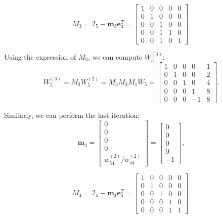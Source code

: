 \documentclass[a4paper,11pt]{article}
\begin{document}
\begin{equation}\label{key}
	M_3=\mathcal{I}_5 - \textbf{m}_3\textbf{e}_3^T =
	\begin{bmatrix}
		1 & 0  & 0  & 0  & 0  \\
		0 & 1 & 0 & 0 & 0\\
		0 & 0 & 1 & 0 & 0 \\
		0 & 0 & 1 & 1 & 0 \\
		0 & 0 & 1 & 0 & 1 
	\end{bmatrix}.
\end{equation}

\noindent Using the expression of $M_3$, we can compute $W_5^{(3)}$:
\begin{equation}\label{key}
	W_5^{(3)} = M_3 W_5^{(2)} = M_3 M_2 M_1 W_5 =
	\begin{bmatrix}
		1 & 0  & 0  & 0  & 1  \\
		0 & 1 & 0 & 0 & 2 \\
		0 & 0 & 1 & 0 & 4 \\
		0 & 0 & 0 & 1 & 8 \\
		0 & 0 & 0 & -1 & 8 
	\end{bmatrix}.
\end{equation}

\noindent Similarly, we can perform the last iteration:
\begin{equation}\label{key}
	\textbf{m}_4 = 
	\begin{bmatrix}
		0\\
		0\\
		0\\
		0\\
		{w^{(2)}_{54}}/{w^{(2)}_{44}}
	\end{bmatrix}=
	\begin{bmatrix}
		0\\
		0\\
		0\\
		0\\
		-1
	\end{bmatrix},
\end{equation}

\begin{equation}\label{key}
	M_4=\mathcal{I}_5 - \textbf{m}_4\textbf{e}_4^T =
	\begin{bmatrix}
		1 & 0  & 0  & 0  & 0  \\
		0 & 1 & 0 & 0 & 0\\
		0 & 0 & 1 & 0 & 0 \\
		0 & 0 & 0 & 1 & 0 \\
		0 & 0 & 0 & 1 & 1 
	\end{bmatrix}.
\end{equation}
\end{document}
